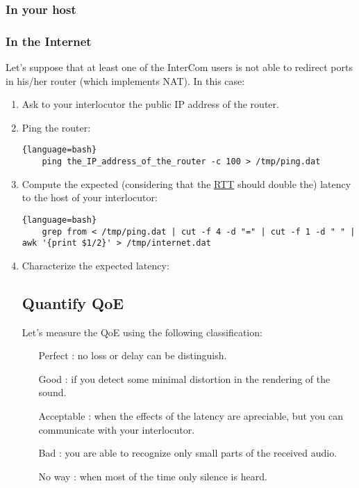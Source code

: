 \subsubsection{In your host}

\subsubsection{In the Internet}

Let's suppose that at least one of the InterCom users is not able to
redirect ports in his/her router (which implements NAT). In this case:

\begin{enumerate}
\item Ask to your interlocutor the public IP address of the router.
\item Ping the router:
  \begin{lstlisting}{language=bash}
    ping the_IP_address_of_the_router -c 100 > /tmp/ping.dat
  \end{lstlisting}
\item Compute the expected (considering that the
  \href{https://en.wikipedia.org/wiki/Round-trip_delay}{RTT} should
  double the) latency to the host of your interlocutor:
  \begin{lstlisting}{language=bash}
    grep from < /tmp/ping.dat | cut -f 4 -d "=" | cut -f 1 -d " " | awk '{print $1/2}' > /tmp/internet.dat
  \end{lstlisting}
\item Characterize the expected latency:

\subsection{Quantify QoE}

Let's measure the QoE using the following classification:
\begin{itemize}
\item [Perfect]: no loss or delay can be distinguish.
\item [Good]: if you detect some minimal distortion in the rendering
  of the sound.
\item [Acceptable]: when the effects of the latency are apreciable, but
  you can communicate with your interlocutor.
\item [Bad]: you are able to recognize only small parts of the
  received audio.
\item [No way]: when most of the time only silence is heard.
\end{itemize}


\end{enumerate}

